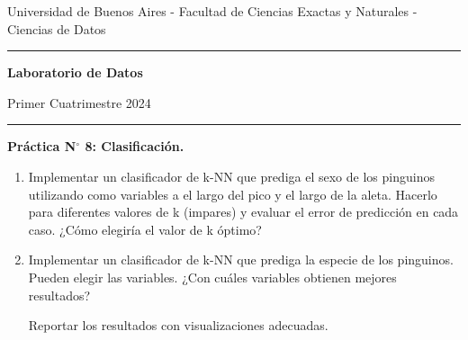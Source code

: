 \documentclass[a4paper,11pt]{article}
\theoremstyle{definition}
\begin{document}
\centerline{{\small Universidad de Buenos Aires - Facultad de Ciencias Exactas y Naturales - Ciencias de Datos}}

\vskip 0.2cm

\hrule

\vskip 0.2cm

 \centerline{{\bf\Large{\sc Laboratorio de Datos}}}

 \vskip 0.2cm

 \centerline{\ttfamily Primer Cuatrimestre 2024}

\vskip 0.2cm

 \hrule

 \bigskip
 \centerline{\bf Práctica N$^\circ$ 8: Clasificación.}
 \bigskip

\begin{enumerate}
\item 
Implementar un clasificador de k-NN que prediga el sexo de los pinguinos utilizando como variables a el largo del pico y el largo de la aleta. Hacerlo para diferentes valores de k (impares) y evaluar el error de predicción en cada caso. ¿Cómo elegiría el valor de k óptimo? 

\item 
Implementar un clasificador de k-NN que prediga la especie de los pinguinos. Pueden elegir las variables. ¿Con cuáles variables obtienen mejores resultados?

Reportar los resultados con visualizaciones adecuadas.
    


\end{enumerate}
\end{document}
